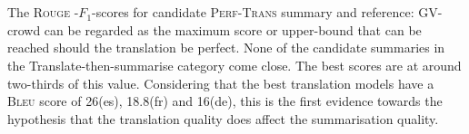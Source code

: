 \documentclass[12pt,a4paper,twoside,openright]{report}
\newcommand{\bleu}{\textsc{Bleu} }
\newcommand{\rouge}{\textsc{Rouge} }
\newcommand{\perftrans}{\textsc{Perf-Trans} }
\newcommand{\fone}{$F_1$}
\begin{document}
\\\\
The \rouge-\fone-scores for candidate \perftrans summary and reference: GV-crowd can be regarded as the maximum score or upper-bound that can be reached should the translation be perfect. None of the candidate summaries in the Translate-then-summarise category come close. The best scores are at around two-thirds of this value. Considering that the best translation models have a \bleu score of 26(es), 18.8(fr) and 16(de), this is the first evidence towards the hypothesis that the translation quality does affect the summarisation quality.














\end{document}

